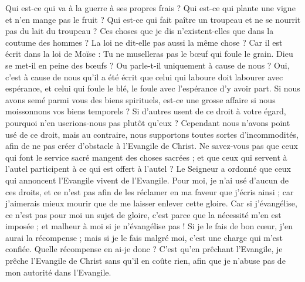 \begin{multicols}{2}
Qui est-ce qui va à la guerre à ses propres frais ? Qui est-ce qui plante une vigne et n’en mange pas le fruit ? Qui est-ce qui fait paître un troupeau et ne se nourrit pas du lait du troupeau ?
Ces choses que je dis n’existent-elles que dans la coutume des hommes ? La loi ne dit-elle pas aussi la même chose ?
Car il est écrit dans la loi de Moïse : Tu ne muselleras pas le bœuf qui foule le grain. Dieu se met-il en peine des bœufs ?
Ou parle-t-il uniquement à cause de nous ? Oui, c’est à cause de nous qu’il a été écrit que celui qui laboure doit labourer avec espérance, et celui qui foule le blé, le foule avec l’espérance d’y avoir part.
Si nous avons semé parmi vous des biens spirituels, est-ce une grosse affaire si nous moissonnons vos biens temporels ?
Si d'autres usent de ce droit à votre égard, pourquoi n'en userions-nous pas plutôt qu'eux ? Cependant nous n'avons point usé de ce droit, mais au contraire, nous supportons toutes sortes d'incommodités, afin de ne pas créer d’obstacle à l'Evangile de Christ.
Ne savez-vous pas que ceux qui font le service sacré mangent des choses sacrées ; et que ceux qui servent à l'autel participent à ce qui est offert à l'autel ?
Le Seigneur a ordonné que ceux qui annoncent l'Evangile vivent de l'Evangile.
Pour moi, je n’ai usé d’aucun de ces droits, et ce n’est pas afin de les réclamer en ma faveur que j’écris ainsi ; car j’aimerais mieux mourir que de me laisser enlever cette gloire.
Car si j'évangélise, ce n’est pas pour moi un sujet de gloire, c’est parce que la nécessité m'en est imposée ; et malheur à moi si je n'évangélise pas !
Si je le fais de bon cœur, j’en aurai la récompense ; mais si je le fais malgré moi, c’est une charge qui m’est confiée.
Quelle récompense en ai-je donc ? C’est qu'en prêchant l'Evangile, je prêche l'Evangile de Christ sans qu'il en coûte rien, afin que je n'abuse pas de mon autorité dans l'Evangile.

\end{multicols}
